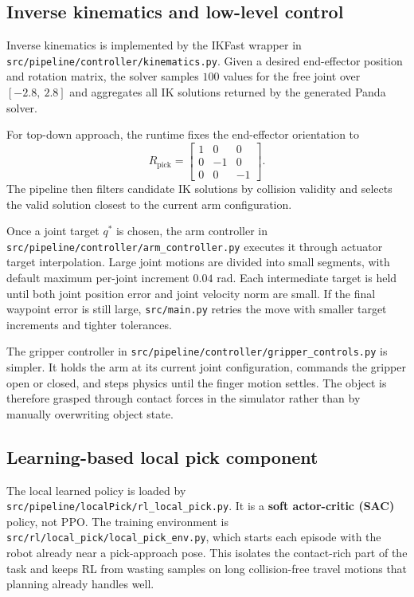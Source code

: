 \documentclass[11pt]{article}
\begin{document}
\subsection{Inverse kinematics and low-level control}

Inverse kinematics is implemented by the IKFast wrapper in \texttt{src/pipeline/controller/kinematics.py}. Given a desired end-effector position and rotation matrix, the solver samples \(100\) values for the free joint over \([-2.8,\ 2.8]\) and aggregates all IK solutions returned by the generated Panda solver.

For top-down approach, the runtime fixes the end-effector orientation to
\[
R_{\text{pick}} =
\begin{bmatrix}
1 & 0 & 0 \\
0 & -1 & 0 \\
0 & 0 & -1
\end{bmatrix}.
\]
The pipeline then filters candidate IK solutions by collision validity and selects the valid solution closest to the current arm configuration.

Once a joint target \(q^\ast\) is chosen, the arm controller in \texttt{src/pipeline/controller/arm\_controller.py} executes it through actuator target interpolation. Large joint motions are divided into small segments, with default maximum per-joint increment \(0.04\) rad. Each intermediate target is held until both joint position error and joint velocity norm are small. If the final waypoint error is still large, \texttt{src/main.py} retries the move with smaller target increments and tighter tolerances.

The gripper controller in \texttt{src/pipeline/controller/gripper\_controls.py} is simpler. It holds the arm at its current joint configuration, commands the gripper open or closed, and steps physics until the finger motion settles. The object is therefore grasped through contact forces in the simulator rather than by manually overwriting object state.

\subsection{Learning-based local pick component}

The local learned policy is loaded by \texttt{src/pipeline/localPick/rl\_local\_pick.py}. It is a \textbf{soft actor-critic (SAC)} policy, not PPO. The training environment is \texttt{src/rl/local\_pick/local\_pick\_env.py}, which starts each episode with the robot already near a pick-approach pose. This isolates the contact-rich part of the task and keeps RL from wasting samples on long collision-free travel motions that planning already handles well.
\end{document}
